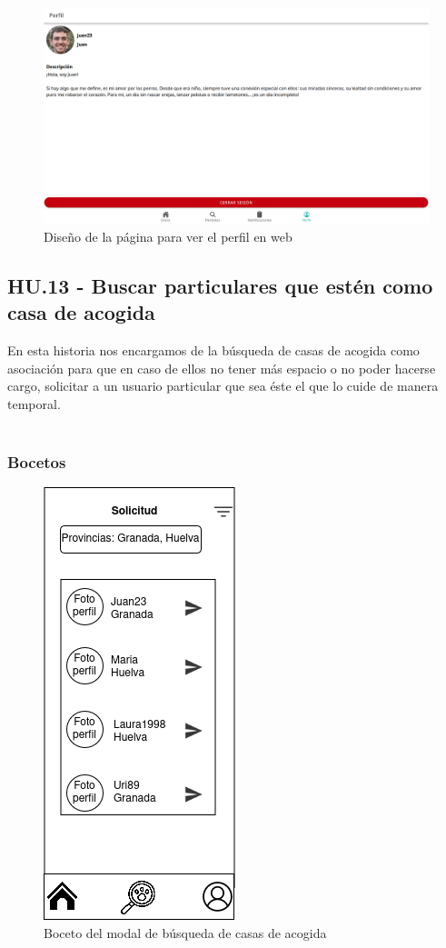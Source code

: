 \begin{figure}[H]
	\centering
	\includegraphics[width=0.8\linewidth]{sprint 3//hu11-12/implementacionWeb.png}
	\caption{Diseño de la página para ver el perfil en web}
\end{figure}

\subsection{HU.13 - Buscar particulares que estén como casa de acogida}

En esta historia nos encargamos de la búsqueda de casas de acogida como asociación para que en caso de ellos no tener más espacio o no poder hacerse cargo, solicitar a un usuario particular que sea éste el que lo cuide de manera temporal. \\ \\

\subsubsection{Bocetos}
\begin{figure}[H]
	\centering
	\includegraphics[width=0.31\linewidth]{sprint 3//hu13/boceto.png}
	\caption{Boceto del modal de búsqueda de casas de acogida }
\end{figure}


